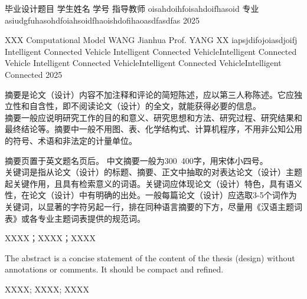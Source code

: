 \documentclass{document}
\begin{document}
\makecovercn
  {毕业设计题目}
  {学生姓名}
  {学号}
  {指导教师}
  {oisahdoihfoisahdoifhasoid}%
  {专业}
  {asiudgfuhasohdfoiahsoidfhaoishdofihaoasdfasdfas}%
  {2025}

\makecoveren
  {XXX Computational Model}
  {WANG Jianhua}
  {Prof. YANG XX}
  {iapsjdifojoiasdjoifj} %
  {Intelligent Connected Vehicle}
  {Intelligent Connected VehicleIntelligent Connected Vehicle} %
  {Intelligent Connected VehicleIntelligent Connected VehicleIntelligent Connected} %
  {2025} 


\begin{cquabstract}

摘要是论文（设计）内容不加注释和评论的简短陈述，应以第三人称陈述。它应独立性和自含性，即不阅读论文（设计）的全文，就能获得必要的信息。\\

摘要一般应说明研究工作的目的和意义、研究思想和方法、研究过程、研究结果和最终结论等。摘要中一般不用图、表、化学结构式、计算机程序，不用非公知公用的符号、术语和非法定的计量单位。

摘要页置于英文题名页后。 
中文摘要一般为300~400字，用宋体小四号。 \\
关键词是指从论文（设计）的标题、摘要、正文中抽取的对表达论文（设计）主题起关键作用，且具有检索意义的词语。关键词应体现论文（设计）特色，具有语义性，在论文（设计）中有明确的出处。一般每篇论文（设计）应选取3-5个词作为关键词，以显著的字符另起一行，排在同种语言摘要的下方，尽量用《汉语主题词表》或各专业主题词表提供的规范词。\\
\end{cquabstract}
  
\begin{cqukeywords}%
    XXXX；XXXX；XXXX
\end{cqukeywords}

\begin{cquabstracten}
  The abstract is a concise statement of the content of the thesis (design) without annotations or comments. It should be compact and refined.
\end{cquabstracten}

\begin{cqukeywordsen}
  XXXX; XXXX; XXXX
\end{cqukeywordsen}
  
\end{document}
